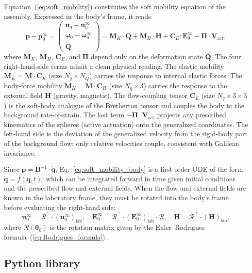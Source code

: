 \documentclass[aps,prfluids,groupedaddress]{revtex4-2}
\newcommand{\bp}{\bm{p}}
\newcommand{\bq}{\bm{q}}
\newcommand{\bu}{\bm{u}}
\newcommand{\bomega}{\bm{\omega}}
\newcommand{\btheta}{\bm{\theta}}
\newcommand{\bH}{\bm{H}}
\newcommand{\bQ}{\bm{Q}}
\newcommand{\bV}{\bm{V}}
\newcommand{\tB}{\bm{{B}}}
\newcommand{\tC}{\bm{{C}}}
\newcommand{\tE}{\bm{{E}}}
\newcommand{\tM}{\bm{{M}}}
\newcommand{\tPi}{\bm{{\Pi}}}
\newcommand{\bqd}{\bm{\dot q}}
\newcommand{\bQd}{\bm{{\dot Q}}}
\newcommand{\mRot}{\bm{\mathcal{R}}}
\begin{document}
Equation~(\ref{eq:soft_mobility}) constitutes the soft mobility equation of the assembly. Expressed in the body's frame, it reads
\begin{equation}\label{eq:soft_mobility_body}
\bp - \bp_0^\infty = 
\left(
\begin{array}{c}
\bu_0 - \bu_0^\infty\\[0.5ex]
\bomega_0 - \bomega_0^\infty\\[0.5ex]
\bQd
\end{array}
\right) =
  \tM_K \cdot \bQ + \tM_H \cdot \bH + \tC_E : \tE_0^\infty - \tPi \cdot \bV_\mathrm{act},
\end{equation}
where $\tM_K$, $\tM_H$, $\tC_E$, and $\tPi$ depend only on the deformation state $\bQ$. 
The four right-hand-side terms admit a clean physical reading. 
The elastic mobility $\tM_K = \tM\cdot\tC_K$ (size $N_q \times N_Q$) carries the response to internal elastic forces. The body-force mobility $\tM_H = \tM\cdot\tC_H$ (size $N_q \times 3$) carries the response to the external field $\bH$ (gravity, magnetic). 
The flow-coupling tensor $\tC_E$ (size $N_q \times 3\times 3$) is the soft-body analogue of the Bretherton tensor and couples the body to the background rate-of-strain. 
The last term $-\tPi\cdot\bV_\mathrm{act}$ projects any prescribed kinematics of the spheres (active actuation) onto the generalized coordinates. The left-hand side is the deviation of the generalized velocity from the rigid-body part of the background flow: only relative velocities couple, consistent with Galilean invariance.

Since $\bp = \tB^{-1}\cdot\bqd$, Eq.~\eqref{eq:soft_mobility_body} is a first-order ODE of the form $\bqd = f(\bq, t)$, which can be integrated forward in time given initial conditions and the prescribed flow and external fields. 
When the flow and external fields are known in the laboratory frame, they must be rotated into the body's frame before evaluating the right-hand side:
\begin{equation}\label{eq:rotation_fields}
\bu_0^\infty = \mRot^\top \cdot \left(\bu_0^\infty\right)_\mathrm{lab}, \quad
\tE_0^\infty = \mRot^\top \cdot \left(\tE_0^\infty\right)_\mathrm{lab} \cdot \mRot, \quad
\bH = \mRot^\top \cdot \left(\bH \right)_\mathrm{lab},
\end{equation}
where $\mRot(\btheta_0)$ is the rotation matrix given by the Euler--Rodrigues formula~(\ref{eq:Rodrigues_formula}).

\subsection{Python library}
\end{document}
